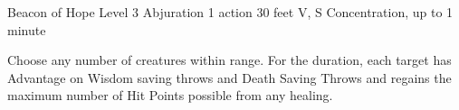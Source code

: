 \DndSpellHeader%
    {Beacon of Hope}
    {Level 3 Abjuration}
    {1 action}
    {30 feet}
    {V, S}
    {Concentration, up to 1 minute}

Choose any number of creatures within range. For the duration, each target has Advantage on Wisdom saving throws and Death Saving Throws and regains the maximum number of Hit Points possible from any healing.
